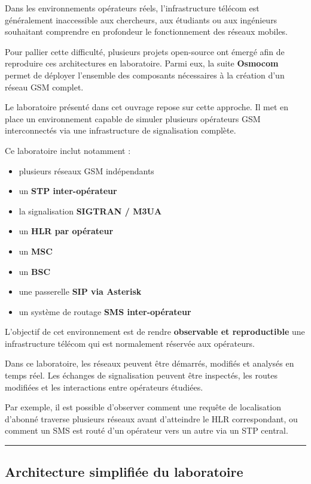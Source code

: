 \documentclass[
  french,
]{article}
\providecommand{\tightlist}{%
  \setlength{\itemsep}{0pt}\setlength{\parskip}{0pt}}
\begin{document}
Dans les environnements opérateurs réels, l'infrastructure télécom est
généralement inaccessible aux chercheurs, aux étudiants ou aux
ingénieurs souhaitant comprendre en profondeur le fonctionnement des
réseaux mobiles.

Pour pallier cette difficulté, plusieurs projets open-source ont émergé
afin de reproduire ces architectures en laboratoire. Parmi eux, la suite
\textbf{Osmocom} permet de déployer l'ensemble des composants
nécessaires à la création d'un réseau GSM complet.

Le laboratoire présenté dans cet ouvrage repose sur cette approche. Il
met en place un environnement capable de simuler plusieurs opérateurs
GSM interconnectés via une infrastructure de signalisation complète.

Ce laboratoire inclut notamment :

\begin{itemize}
\tightlist
\item
  plusieurs réseaux GSM indépendants
\item
  un \textbf{STP inter-opérateur}
\item
  la signalisation \textbf{SIGTRAN / M3UA}
\item
  un \textbf{HLR par opérateur}
\item
  un \textbf{MSC}
\item
  un \textbf{BSC}
\item
  une passerelle \textbf{SIP via Asterisk}
\item
  un système de routage \textbf{SMS inter-opérateur}
\end{itemize}

L'objectif de cet environnement est de rendre \textbf{observable et
reproductible} une infrastructure télécom qui est normalement réservée
aux opérateurs.

Dans ce laboratoire, les réseaux peuvent être démarrés, modifiés et
analysés en temps réel. Les échanges de signalisation peuvent être
inspectés, les routes modifiées et les interactions entre opérateurs
étudiées.

Par exemple, il est possible d'observer comment une requête de
localisation d'abonné traverse plusieurs réseaux avant d'atteindre le
HLR correspondant, ou comment un SMS est routé d'un opérateur vers un
autre via un STP central.

\begin{center}\rule{0.5\linewidth}{0.5pt}\end{center}

\subsection{Architecture simplifiée du
laboratoire}\label{architecture-simplifiuxe9e-du-laboratoire}
\end{document}
